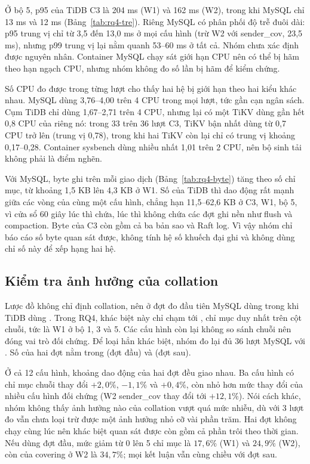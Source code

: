 Ở bộ 5, p95 của TiDB C3 là 204 ms (W1) và 162 ms (W2), trong khi MySQL chỉ 13 ms và 12 ms (Bảng~\ref{tab:rq4-tre}). Riêng MySQL có phân phối độ trễ đuôi dài: p95 trung vị chỉ từ 3,5 đến 13,0 ms ở mọi cấu hình (trừ W2 với sender\_cov, 23,5 ms), nhưng p99 trung vị lại nằm quanh 53--60 ms ở tất cả. Nhóm chưa xác định được nguyên nhân. Container MySQL chạy sát giới hạn CPU nên có thể bị hãm theo hạn ngạch CPU, nhưng nhóm không đo số lần bị hãm để kiểm chứng.

Số CPU đo được trong từng lượt cho thấy hai hệ bị giới hạn theo hai kiểu khác nhau. MySQL dùng 3,76--4,00 trên 4 CPU trong mọi lượt, tức gần cạn ngân sách. Cụm TiDB chỉ dùng 1,67--2,71 trên 4 CPU, nhưng lại có một TiKV dùng gần hết 0,8 CPU của riêng nó: trong 33 trên 36 lượt C3, TiKV bận nhất dùng từ 0,7 CPU trở lên (trung vị 0,78), trong khi hai TiKV còn lại chỉ có trung vị khoảng 0,17--0,28. Container sysbench dùng nhiều nhất 1,01 trên 2 CPU, nên bộ sinh tải không phải là điểm nghẽn.

Với MySQL, byte ghi trên mỗi giao dịch (Bảng~\ref{tab:rq4-byte}) tăng theo số chỉ mục, từ khoảng 1,5 KB lên 4,3 KB ở W1. Số của TiDB thì dao động rất mạnh giữa các vòng của cùng một cấu hình, chẳng hạn 11,5--62,6 KB ở C3, W1, bộ 5, vì cửa sổ 60 giây lúc thì chứa, lúc thì không chứa các đợt ghi nền như flush và compaction. Byte của C3 còn gồm cả ba bản sao và Raft log. Vì vậy nhóm chỉ báo cáo số byte quan sát được, không tính hệ số khuếch đại ghi và không dùng chỉ số này để xếp hạng hai hệ.

\subsection{Kiểm tra ảnh hưởng của collation}
\label{sec:rq4-collation}

Lược đồ không chỉ định collation, nên ở đợt đo đầu tiên MySQL dùng  trong khi TiDB dùng . Trong RQ4, khác biệt này chỉ chạm tới , chỉ mục duy nhất trên cột chuỗi, tức là W1 ở bộ 1, 3 và 5. Các cấu hình còn lại không so sánh chuỗi nên đóng vai trò đối chứng. Để loại hẳn khác biệt, nhóm đo lại đủ 36 lượt MySQL với . Số của hai đợt nằm trong  (đợt đầu) và  (đợt sau).

Ở cả 12 cấu hình, khoảng dao động của hai đợt đều giao nhau. Ba cấu hình có chỉ mục chuỗi thay đổi $+2{,}0\%$, $-1{,}1\%$ và $+0{,}4\%$, còn nhỏ hơn mức thay đổi của nhiều cấu hình đối chứng (W2 sender\_cov thay đổi tới $+12{,}1\%$). Nói cách khác, nhóm không thấy ảnh hưởng nào của collation vượt quá mức nhiễu, dù với 3 lượt đo vẫn chưa loại trừ được một ảnh hưởng nhỏ cỡ vài phần trăm. Hai đợt không chạy cùng lúc nên khác biệt quan sát được còn gồm cả phần trôi theo thời gian. Nếu dùng đợt đầu, mức giảm từ 0 lên 5 chỉ mục là $17{,}6\%$ (W1) và $24{,}9\%$ (W2), còn của covering ở W2 là $34{,}7\%$; mọi kết luận vẫn cùng chiều với đợt sau.

